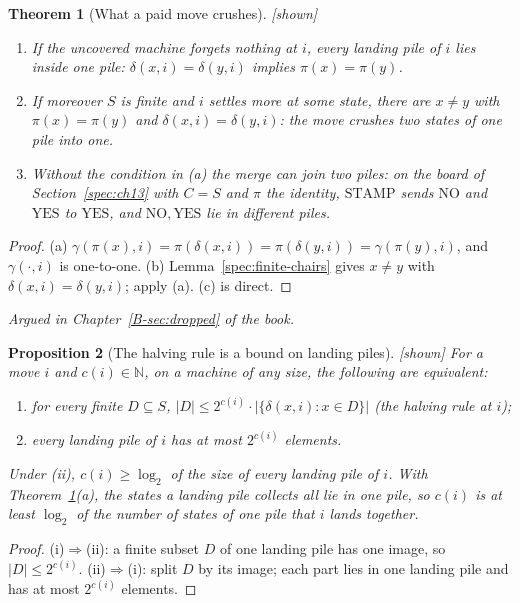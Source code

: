 \documentclass[11pt, a4paper]{article}
\theoremstyle{plain}
\newtheorem{theorem}{Theorem}[section]
\newtheorem{proposition}[theorem]{Proposition}
\theoremstyle{definition}
\theoremstyle{remark}
\newcommand{\N}{\mathbb{N}}
\newcommand{\step}{\delta}
\newcommand{\cost}{c}
\newcommand{\argued}[1]{\par\noindent\textit{Argued in Chapter~\ref{B-#1} of the book.}\par}
\newcommand{\kind}[1]{\textup{[#1]}}
\begin{document}
\begin{theorem}[What a paid move crushes]\label{spec:crush-pile} \kind{shown}
\begin{enumerate}[label=(\alph*)]
\item If the uncovered machine forgets nothing at $i$, every landing pile of $i$ lies inside one pile:
$\step(x,i)=\step(y,i)$ implies $\pi(x)=\pi(y)$.
\item If moreover $S$ is finite and $i$ settles more at some state, there are $x\ne y$ with
$\pi(x)=\pi(y)$ and $\step(x,i)=\step(y,i)$: the move crushes two states of one pile into one.
\item Without the condition in (a) the merge can join two piles: on the board of Section~\ref{spec:ch13}
with $C=S$ and $\pi$ the identity, $\mathrm{STAMP}$ sends $\mathrm{NO}$ and $\mathrm{YES}$ to
$\mathrm{YES}$, and $\mathrm{NO},\mathrm{YES}$ lie in different piles.
\end{enumerate}
\end{theorem}

\begin{proof}
(a) $\gamma(\pi(x),i)=\pi(\step(x,i))=\pi(\step(y,i))=\gamma(\pi(y),i)$, and $\gamma(\cdot,i)$ is one-to-one.
(b) Lemma~\ref{spec:finite-chairs} gives $x\ne y$ with $\step(x,i)=\step(y,i)$; apply (a). (c) is direct.
\end{proof}

\argued{sec:dropped}

\begin{proposition}[The halving rule is a bound on landing piles]\label{spec:halving-piles} \kind{shown}
For a move $i$ and $\cost(i)\in\N$, on a machine of any size, the following are equivalent:
\begin{enumerate}[label=(\roman*)]
\item for every finite $D\subseteq S$, $|D|\le 2^{\cost(i)}\cdot|\{\step(x,i):x\in D\}|$ (the halving rule at $i$);
\item every landing pile of $i$ has at most $2^{\cost(i)}$ elements.
\end{enumerate}
Under (ii), $\cost(i)\ge\log_2$ of the size of every landing pile of $i$. With
Theorem~\ref{spec:crush-pile}(a), the states a landing pile collects all lie in one pile, so $\cost(i)$ is at
least $\log_2$ of the number of states of one pile that $i$ lands together.
\end{proposition}

\begin{proof}
(i)$\Rightarrow$(ii): a finite subset $D$ of one landing pile has one image, so $|D|\le 2^{\cost(i)}$.
(ii)$\Rightarrow$(i): split $D$ by its image; each part lies in one landing pile and has at most
$2^{\cost(i)}$ elements.
\end{proof}
\end{document}
